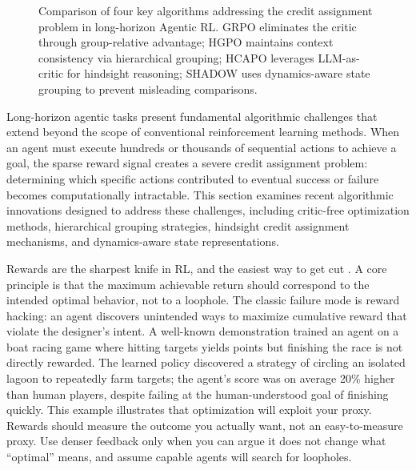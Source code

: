 \begin{figure}[tbp]
    \caption{Comparison of four key algorithms addressing the credit assignment problem in long-horizon Agentic RL. GRPO eliminates the critic through group-relative advantage; HGPO maintains context consistency via hierarchical grouping; HCAPO leverages LLM-as-critic for hindsight reasoning; SHADOW uses dynamics-aware state grouping to prevent misleading comparisons.}
    \label{fig:algorithms}
\end{figure}



Long-horizon agentic tasks present fundamental algorithmic challenges that extend beyond the scope of conventional reinforcement learning methods. When an agent must execute hundreds or thousands of sequential actions to achieve a goal, the sparse reward signal creates a severe credit assignment problem: determining which specific actions contributed to eventual success or failure becomes computationally intractable. This section examines recent algorithmic innovations designed to address these challenges, including critic-free optimization methods, hierarchical grouping strategies, hindsight credit assignment mechanisms, and dynamics-aware state representations.

Rewards are the sharpest knife in RL, and the easiest way to get cut \citep{abaka2025designing}. A core principle is that the maximum achievable return should correspond to the intended optimal behavior, not to a loophole. The classic failure mode is reward hacking: an agent discovers unintended ways to maximize cumulative reward that violate the designer's intent. A well-known demonstration trained an agent on a boat racing game where hitting targets yields points but finishing the race is not directly rewarded. The learned policy discovered a strategy of circling an isolated lagoon to repeatedly farm targets; the agent's score was on average 20\% higher than human players, despite failing at the human-understood goal of finishing quickly. This example illustrates that optimization will exploit your proxy. Rewards should measure the outcome you actually want, not an easy-to-measure proxy. Use denser feedback only when you can argue it does not change what ``optimal'' means, and assume capable agents will search for loopholes.


